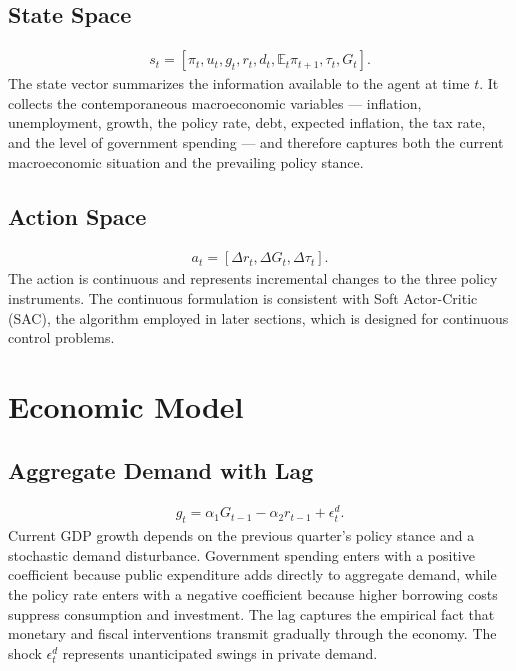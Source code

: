 \documentclass[11pt]{article}
\begin{document}
\subsection{State Space}
\begin{align}
    s_t = [\pi_t, u_t, g_t, r_t, d_t, \mathbb{E}_t\pi_{t+1}, \tau_t, G_t].
\end{align}
The state vector summarizes the information available to the agent at time $t$. It collects the contemporaneous macroeconomic variables — inflation, unemployment, growth, the policy rate, debt, expected inflation, the tax rate, and the level of government spending — and therefore captures both the current macroeconomic situation and the prevailing policy stance.

\subsection{Action Space}
\begin{align*}
    a_t = [\Delta r_t, \Delta G_t, \Delta \tau_t].
\end{align*}
The action is continuous and represents incremental changes to the three policy instruments. The continuous formulation is consistent with Soft Actor-Critic (SAC), the algorithm employed in later sections, which is designed for continuous control problems.

\section{Economic Model}

\subsection{Aggregate Demand with Lag}
\begin{align}
    g_t = \alpha_1 G_{t-1} - \alpha_2 r_{t-1} + \epsilon_t^d.
\end{align}
Current GDP growth depends on the previous quarter's policy stance and a stochastic demand disturbance. Government spending enters with a positive coefficient because public expenditure adds directly to aggregate demand, while the policy rate enters with a negative coefficient because higher borrowing costs suppress consumption and investment. The lag captures the empirical fact that monetary and fiscal interventions transmit gradually through the economy. The shock $\epsilon_t^d$ represents unanticipated swings in private demand.
\end{document}
